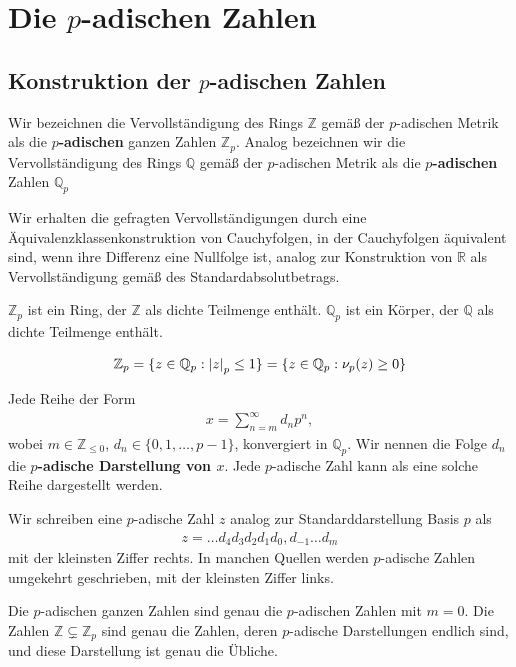 \documentclass{report}
\newcommand*{\newpar}{\par\vspace{\baselineskip}\noindent}
\newcommand{\tbf}[1]{\textbf{#1}}
\newcommand{\bQ}{\mathbb{Q}}
\newcommand{\bR}{\mathbb{R}}
\newcommand{\bZ}{\mathbb{Z}}
\begin{document}
	\chapter{Die $p$-adischen Zahlen}
	\section{Konstruktion der $p$-adischen Zahlen}
	\begin{definition}
		Wir bezeichnen die Vervollständigung des Rings $\bZ$ gemäß der $p$-adischen Metrik als die \tbf{$p$-adischen} ganzen Zahlen $\bZ_p$. Analog bezeichnen wir die Vervollständigung des Rings $\bQ$ gemäß der $p$-adischen Metrik als die \tbf{$p$-adischen} Zahlen $\bQ_p$
	\end{definition}
	\noindent Wir erhalten die gefragten Vervollständigungen durch eine Äquivalenzklassenkonstruktion von Cauchyfolgen, in der Cauchyfolgen äquivalent sind, wenn ihre Differenz eine Nullfolge ist, analog zur Konstruktion von $\bR$ als Vervollständigung gemäß des Standardabsolutbetrags.
	\begin{proposition}
		$\bZ_p$ ist ein Ring, der $\bZ$ als dichte Teilmenge enthält. $\bQ_p$ ist ein Körper, der $\bQ$ als dichte Teilmenge enthält.
	\end{proposition}
	\begin{proposition}
		\begin{align*}
			\bZ_p = \{z \in \bQ_p : \abs{z}_p \leq 1\} = \{z \in \bQ_p : \nu_p(z) \geq 0\}
		\end{align*}
	\end{proposition}
	\begin{proposition}
		Jede Reihe der Form
		\begin{align*}
			x = \sum_{n = m}^\infty d_n p^n,
		\end{align*}
		wobei $m \in \bZ_{\leq 0}$, $d_n \in \{0,1,\hdots,p-1\}$, konvergiert in $\bQ_p$. Wir nennen die Folge $d_n$ die \tbf{$p$-adische Darstellung von $x$}. Jede $p$-adische Zahl kann als eine solche Reihe dargestellt werden.
	\end{proposition}
	\noindent Wir schreiben eine $p$-adische Zahl $z$ analog zur Standarddarstellung Basis $p$ als 
	\begin{align*}
		z = \hdots d_4 d_3 d_2 d_1 d_0, d_{-1} \hdots d_{m}
	\end{align*}
	mit der kleinsten Ziffer rechts. In manchen Quellen werden $p$-adische Zahlen umgekehrt geschrieben, mit der kleinsten Ziffer links.
	\newpar
	\noindent Die $p$-adischen ganzen Zahlen sind genau die $p$-adischen Zahlen mit $m = 0$. Die Zahlen $\bZ \subsetneq \bZ_p$ sind genau die Zahlen, deren $p$-adische Darstellungen endlich sind, und diese Darstellung ist genau die Übliche.
\end{document}
